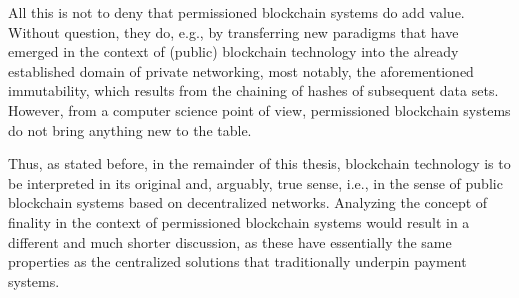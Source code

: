 All this is not to deny that permissioned blockchain systems do add value.
Without question, they do, e.g., by transferring new paradigms that have emerged in the context of (public) blockchain technology into the already established domain of private networking, most notably, the aforementioned immutability, which results from the chaining of hashes of subsequent data sets.
However, from a computer science point of view, permissioned blockchain systems do not bring anything new to the table.

Thus, as stated before, in the remainder of this thesis, blockchain technology is to be interpreted in its original and, arguably, true sense, i.e., in the sense of public blockchain systems based on decentralized networks.
Analyzing the concept of finality in the context of permissioned blockchain systems would result in a different and much shorter discussion, as these have essentially the same properties as the centralized solutions that traditionally underpin payment systems.
